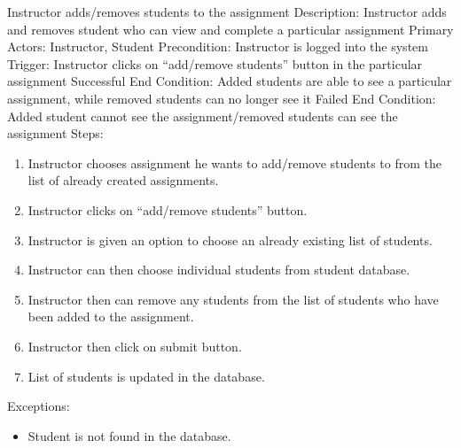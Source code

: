     \begin{section}{Instructor adds/removes students to the assignment}
		Description: Instructor adds and removes student who can view and complete a particular assignment \newline
		Primary Actors: Instructor, Student \newline
		Precondition: Instructor is logged into the system \newline
		Trigger: Instructor clicks on “add/remove students” button in the particular assignment \newline
		Successful End Condition: Added students are able to see a particular assignment, while removed students can no longer see it \newline
		Failed End Condition: Added student cannot see the assignment/removed students can see the assignment \newline
        \newline
        Steps:
        \begin{enumerate}
            \item{Instructor chooses assignment he wants to add/remove students to from the list of already created assignments.}
            \item{Instructor clicks on “add/remove students” button.}
            \item{Instructor is given an option to choose an already existing list of students.}
            \item{Instructor can then choose individual students from student database.}
            \item{Instructor then can remove any students from the list of students who have been added to the assignment.}
            \item{Instructor then click on submit button.}
			\item{List of students is updated in the database.}
        \end{enumerate}
        Exceptions:
        \begin{itemize}
            \item{Student is not found in the database.}
        \end{itemize}
    \end{section}
	
